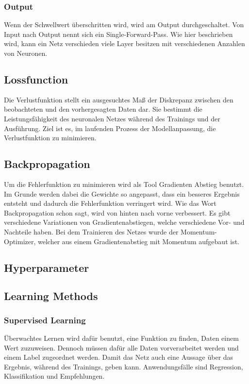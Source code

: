\subsubsection{Output}
Wenn der Schwellwert überschritten wird, wird am Output durchgeschaltet.
Von Input nach Output nennt sich ein Single-Forward-Pass. Wie hier beschrieben wird, kann ein Netz verschieden viele Layer besitzen mit verschiedenen Anzahlen von Neuronen.

\subsection{Lossfunction}
Die Verlustfunktion stellt ein ausgesuchtes Maß der Diskrepanz zwischen den beobachteten und den vorhergesagten Daten dar. Sie bestimmt die Leistungsfähigkeit des neuronalen Netzes während des Trainings und der Ausführung. Ziel ist es, im laufenden Prozess der Modellanpassung, die Verlustfunktion zu minimieren.

\subsection{Backpropagation}
Um die Fehlerfunktion zu minimieren wird als Tool Gradienten Abstieg benutzt. Im Grunde werden dabei die Gewichte so angepasst, dass ein besseres Ergebnis entsteht und dadurch die Fehlerfunktion verringert wird. Wie das Wort Backpropagation schon sagt, wird von hinten nach vorne verbessert. Es gibt verschiedene Variationen von Gradientenabstiegen, welche verschiedene Vor- und Nachteile haben. Bei dem Trainieren des Netzes wurde der Momentum-Optimizer, welcher aus einem Gradientenabstieg mit Momentum aufgebaut ist.

\subsection{Hyperparameter}


\subsection{Learning Methods}

\subsubsection{Supervised Learning}
Überwachtes Lernen wird dafür benutzt, eine Funktion zu finden, Daten einem Wert zuzuweisen. Dennoch müssen dafür alle Daten vorverarbeitet werden und einem Label zugeordnet werden. Damit das Netz auch eine Aussage über das Ergebnis, während des Trainings, geben kann. Anwendungsfälle sind Regression, Klassifikation und Empfehlungen.

